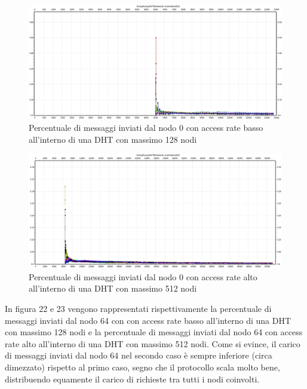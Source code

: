 \documentclass[	
	DIV=calc,
	paper=a4,
	fontsize=11pt,
	onecolumn
]{scrartcl} %
\begin{document}
	\begin{figure}[H]
		\centering
		\includegraphics[scale=0.35]	{SymphonyDHT/plots/PercentageOfMessagesSent/128_Nodes_SlowAccess/SymphonyDHT_128Nodes_SlowAccess_Node0.png}
		\caption{Percentuale di messaggi inviati dal nodo 0 con access rate basso all'interno di una DHT con massimo 128 nodi}
		\label{Figura 20}
	\end{figure}
	\begin{figure}[H]
		\centering
		\includegraphics[scale=0.35]	{SymphonyDHT/plots/PercentageOfMessagesSent/512_Nodes_FastAccess/SymphonyDHT_512Nodes_FastAccess_Node0.png}
		\caption{Percentuale di messaggi inviati dal nodo 0 con access rate alto all'interno di una DHT con massimo 512 nodi}
		\label{Figura 21}
	\end{figure}
	
	In figura 22 e 23 vengono rappresentati rispettivamente la percentuale di messaggi inviati dal nodo 64 con con access rate basso all'interno di una DHT con massimo 128 nodi e la percentuale di messaggi inviati dal nodo 64 con access rate alto all'interno di una DHT con massimo 512 nodi. Come si evince, il carico di messaggi inviati dal nodo 64 nel secondo caso è sempre inferiore (circa dimezzato) rispetto al primo caso, segno che il protocollo scala molto bene, distribuendo equamente il carico di richieste tra tutti i nodi coinvolti.
	
\end{document}
